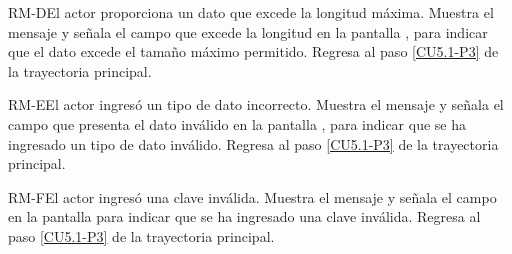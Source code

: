 	\begin{UCtrayectoriaA}{RM-D}{El actor proporciona un dato que excede la longitud máxima.}
		\UCpaso[\UCsist] Muestra el mensaje  y señala el campo que excede la longitud en la pantalla , para indicar que el dato excede el tamaño máximo permitido.
		\UCpaso Regresa al paso \ref{CU5.1-P3} de la trayectoria principal.
	\end{UCtrayectoriaA}

	\begin{UCtrayectoriaA}{RM-E}{El actor ingresó un tipo de dato incorrecto.}
		\UCpaso[\UCsist] Muestra el mensaje  y señala el campo que presenta el dato inválido en la pantalla , para indicar que se ha ingresado un tipo de dato inválido.
		\UCpaso Regresa al paso \ref{CU5.1-P3} de la trayectoria principal.
	\end{UCtrayectoriaA}

	\begin{UCtrayectoriaA}{RM-F}{El actor ingresó una clave inválida.}
		\UCpaso[\UCsist] Muestra el mensaje  y señala el campo en la pantalla  para indicar que se ha ingresado una clave inválida.
		\UCpaso Regresa al paso \ref{CU5.1-P3} de la trayectoria principal.
	\end{UCtrayectoriaA}

